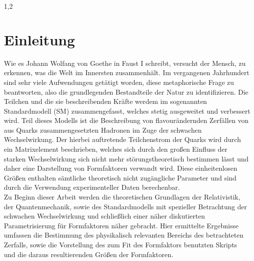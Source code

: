 \documentclass[11pt,a4paper,twoside]{report}
\begin{document}
\begin{spacing}{1,2}
\newpage


\tableofcontents\newpage
{}
\listoffigures\newpage
{}
\listoftables\newpage

\setcounter{page}{0}

\chapter{Einleitung}
Wie es Johann Wolfang von Goethe in Faust I schreibt, versucht der Mensch, zu erkennen, was die Welt im Innersten zusammenhält. Im vergangenen Jahrhundert
sind sehr viele Aufwendungen getätigt worden, diese metaphorische Frage zu beantworten, also die grundlegenden Bestandteile der Natur zu identifizieren.
Die Teilchen und die sie beschreibenden Kräfte werdem im sogenannten Standardmodell (SM) zusammengefasst, welches stetig ausgeweitet und verbessert wird.
Teil dieses Modells ist die Beschreibung von flavourändernden Zerfällen von aus Quarks zusammengesetzten Hadronen im Zuge der schwachen Wechselwirkung. 
Der hierbei auftretende Teilchenstrom der Quarks wird durch ein Matrixelement beschrieben, welches sich durch den großen Einfluss der starken Wechselwirkung
sich nicht mehr störungstheoretisch bestimmen lässt und daher eine Darstellung von Formfaktoren verwandt wird. Diese einheitenlosen Größen enthalten sämtliche
theoretisch nicht zugängliche Parameter und sind durch die Verwendung experimenteller Daten berechenbar.\\
\noindent
Zu Beginn dieser Arbeit werden die theoretischen Grundlagen der Relativistik, der Quantenmechanik, sowie des Standardmodells mit spezieller Betrachtung der 
schwachen Wechselwirkung und schließlich einer näher diskutierten Parametrisierung für Formfaktoren näher gebracht. Hier ermittelte Ergebnisse umfassen
die Bestimmung des physikalisch relevanten Bereichs des betrachteten Zerfalls, sowie die Vorstellung des zum Fit des Formfaktors benutzten Skripts und die 
daraus resultierenden Größen der Formfaktoren.


\end{spacing}
\end{document}
